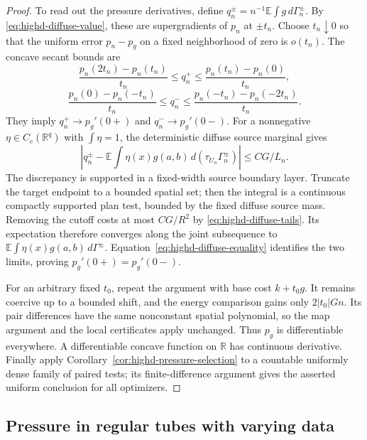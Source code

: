 \documentclass[11pt,reqno]{amsart}
\theoremstyle{definition}
\theoremstyle{remark}
\numberwithin{equation}{section}
\newcommand{\R}{\mathbb R}
\newcommand{\E}{\mathbb E}
\begin{document}
\begin{proof}
To read out the pressure derivatives, define
\(q_n^\pm=n^{-1}\E\int g\,d\Gamma_n^\pm\).
By \eqref{eq:highd-diffuse-value}, these are supergradients of
\(p_n\) at \(\pm t_n\). Choose \(t_n\downarrow0\) so that
the uniform error \(p_n-p_g\) on a fixed neighborhood of zero
is \(o(t_n)\). The concave secant bounds are
\[
 \frac{p_n(2t_n)-p_n(t_n)}{t_n}
 \le q_n^+\le\frac{p_n(t_n)-p_n(0)}{t_n},
\]
\[
 \frac{p_n(0)-p_n(-t_n)}{t_n}
 \le q_n^-\le\frac{p_n(-t_n)-p_n(-2t_n)}{t_n}.
\]
They imply \(q_n^+\to p_g'(0+)\) and
\(q_n^-\to p_g'(0-)\).
For a nonnegative \(\eta\in C_c(\R^q)\) with
\(\int\eta=1\), the deterministic diffuse source marginal gives
\[
 \left|q_n^\pm-
   \E\int\eta(x)g(a,b)\,d(\tau_{U_n}\Gamma_n^\pm)\right|
       \le C G/L_n.
\]
The discrepancy is supported in a fixed-width source boundary
layer. Truncate the target endpoint to a bounded spatial set; then
the integral is a continuous compactly supported plan test, bounded
by the fixed diffuse source mass. Removing the cutoff costs at most
\(CG/R^2\) by \eqref{eq:highd-diffuse-tails}. Its expectation
therefore converges along the joint subsequence to
\(\E\int\eta(x)g(a,b)\,d\Gamma^\pm\).
Equation~\eqref{eq:highd-diffuse-equality} identifies the two
limits, proving \(p_g'(0+)=p_g'(0-)\).

For an arbitrary fixed \(t_0\), repeat the argument with base cost
\(k+t_0g\). It remains coercive up to a bounded shift, and the
energy comparison gains only \(2|t_0|Gn\). Its pair differences
have the same nonconstant spatial polynomial, so the map argument
and the local certificates apply unchanged. Thus \(p_g\) is
differentiable everywhere. A differentiable concave function on
\(\R\) has continuous derivative. Finally apply
Corollary~\ref{cor:highd-pressure-selection} to a countable uniformly
dense family of paired tests; its finite-difference argument gives
the asserted uniform conclusion for all optimizers.
\end{proof}


\subsection{Pressure in regular tubes with varying data}
\label{subsec:highd-variable-pressure}
\end{document}
